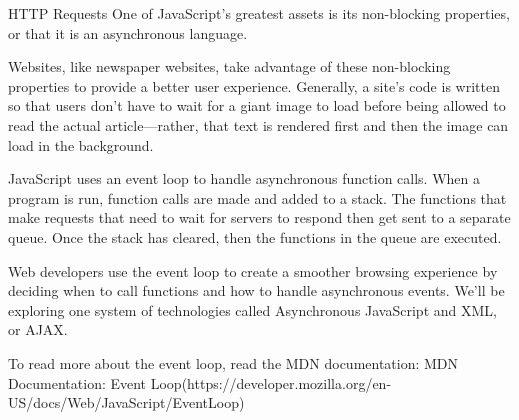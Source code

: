 HTTP Requests
    One of JavaScript’s greatest assets is its non-blocking properties, or that it is an asynchronous language.
    
    Websites, like newspaper websites, take advantage of these non-blocking properties to provide a better user experience. Generally, a site’s code is written so that users don’t have to wait for a giant image to load before being allowed to read the actual article—rather, that text is rendered first and then the image can load in the background.

    JavaScript uses an event loop to handle asynchronous function calls. When a program is run, function calls are made and added to a stack. The functions that make requests that need to wait for servers to respond then get sent to a separate queue. Once the stack has cleared, then the functions in the queue are executed.

    Web developers use the event loop to create a smoother browsing experience by deciding when to call functions and how to handle asynchronous events. We’ll be exploring one system of technologies called Asynchronous JavaScript and XML, or AJAX.

    To read more about the event loop, read the MDN documentation:
        MDN Documentation: Event Loop(https://developer.mozilla.org/en-US/docs/Web/JavaScript/EventLoop)
